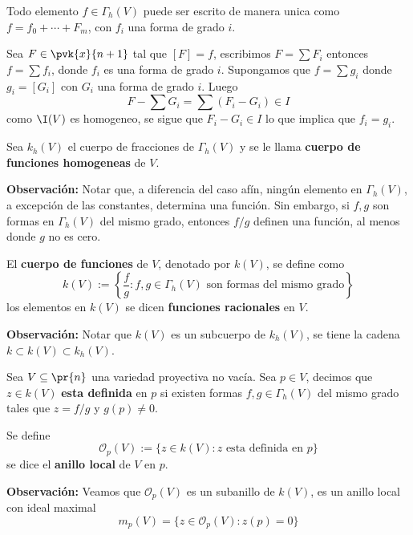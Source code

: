 \documentclass{article}
\begin{document}
\begin{prop}
    Todo elemento $f\in\Gamma_{h}(V)$ puede ser escrito de manera unica como 
    $f=f_{0}+\cdots+F_{m}$, con $f_{i}$ una forma de grado $i$.
\end{prop}
\begin{dem}
    Sea $F\in\pvk{x}{n+1}$ tal que $[F]=f$, escribimos $F=\sum F_{i}$ entonces $f=\sum f_{i}$, 
    donde $f_{i}$ es una forma de grado $i$. Supongamos que $f=\sum g_{i}$ donde $g_{i}=[G_{i}]$
    con $G_{i}$ una forma de grado $i$. Luego
    \begin{equation*}
        F-\sum G_{i}=\sum(F_{i}-G_{i})\in I
    \end{equation*}
    como $\I(V)$ es homogeneo, se sigue que $F_{i}-G_{i}\in I$ lo que implica que $f_{i}=g_{i}$.
\end{dem}
\begin{dfn}
    Sea $k_{h}(V)$ el cuerpo de fracciones de $\Gamma_{h}(V)$ y se le llama 
    \textbf{cuerpo de funciones homogeneas} de $V$.
\end{dfn}
\noindent\textbf{Observación:} Notar que, a diferencia del caso afín, ningún elemento en 
$\Gamma_{h}(V)$, a excepción de las constantes, determina una función. Sin embargo, si $f,g$ son 
formas en $\Gamma_{h}(V)$ del mismo grado, entonces $f/g$ definen una función, al menos donde
$g$ no es cero.
\begin{dfn}
    El \textbf{cuerpo de funciones} de $V$, denotado por $k(V)$, se define como
    \begin{equation*}
        k(V):=\left\{\frac{f}{g}:f,g\in\Gamma_{h}(V)\text{ son formas del mismo grado}\right\}
    \end{equation*}
    los elementos en $k(V)$ se dicen \textbf{funciones racionales} en $V$.
\end{dfn}
\noindent\textbf{Observación:} Notar que $k(V)$ es un subcuerpo de $k_{h}(V)$, se tiene la cadena
$k\subset k(V)\subset k_{h}(V)$.
\begin{dfn}
    Sea $V\subseteq\pr{n}$ una variedad proyectiva no vacía. Sea $p\in V$, decimos que $z\in k(V)$
    \textbf{esta definida} en $p$ si existen formas $f,g\in\Gamma_{h}(V)$ del mismo grado tales 
    que $z=f/g$ y $g(p)\neq0$.
\end{dfn}
\begin{dfn}
    Se define
    \begin{equation*}
        \mathcal{O}_{p}(V):=\{z\in k(V):z\text{ esta definida en }p\}
    \end{equation*}
    se dice el \textbf{anillo local} de $V$ en $p$.
\end{dfn}
\noindent\textbf{Observación:} Veamos que $\mathcal{O}_{p}(V)$ es un subanillo de $k(V)$, es un
anillo local con ideal maximal
\begin{equation*}
    m_{p}(V)=\{z\in\mathcal{O}_{p}(V):z(p)=0\}
\end{equation*}

\end{document}
